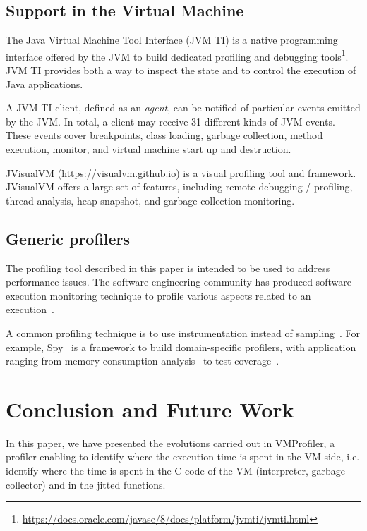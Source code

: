 \documentclass[10pt,preprint,nonatbib]{sigplanconf}
\newcommand{\seclabel}[1]{\label{sec:#1}}
\begin{document}
\subsection{Support in the Virtual Machine}

The Java Virtual Machine Tool Interface (JVM TI) is a native programming interface offered by the JVM to build dedicated profiling and debugging tools\footnote{\url{https://docs.oracle.com/javase/8/docs/platform/jvmti/jvmti.html}}. JVM TI provides both a way to inspect the state and to control the execution of Java applications. %

A JVM TI client, defined as an \emph{agent}, can be notified of particular events emitted by the JVM. In total, a client may receive 31 different kinds of JVM events. These events cover breakpoints, class loading, garbage collection, method execution, monitor, and virtual machine start up and destruction.

JVisualVM (\url{https://visualvm.github.io}) is a visual profiling tool and framework. JVisualVM offers a large set of features, including remote debugging / profiling, thread analysis, heap snapshot, and garbage collection monitoring. 

\subsection{Generic profilers}

The profiling tool described in this paper is intended to be used to address performance issues. The software engineering community has produced software execution monitoring technique to profile various aspects related to an execution~\cite{Ress12a,Ress12b}. 

A common profiling technique is to use instrumentation instead of sampling~\cite{Metz05a}. For example, Spy~\cite{Berg11h} is a framework to build domain-specific profilers, with application ranging from memory consumption analysis~\cite{Infa15a} to test coverage~\cite{Berg12c}.


\section{Conclusion and Future Work}\seclabel{conclusion}

In this paper, we have presented the evolutions carried out in VMProfiler, a profiler enabling to identify where the execution time is spent in the VM side, i.e. identify where the time is spent in the C code of the VM (interpreter, garbage collector) and in the jitted functions.
\end{document}
